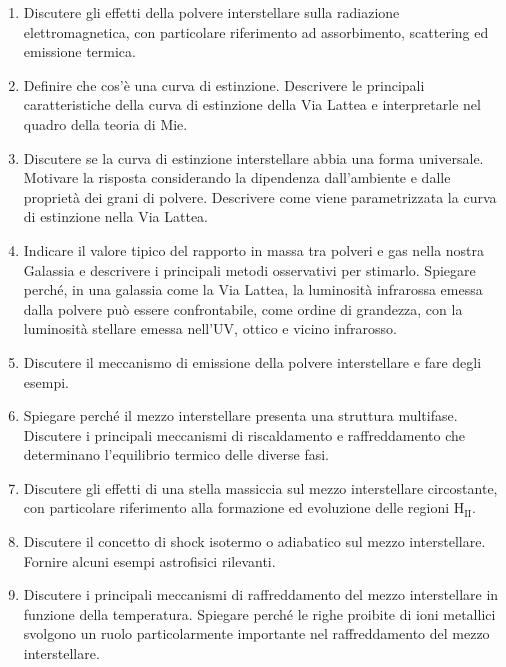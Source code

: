 \begin{enumerate}
    \item Discutere gli effetti della polvere interstellare sulla radiazione elettromagnetica, con particolare riferimento ad assorbimento, scattering ed emissione termica.
    \item Definire che cos’è una curva di estinzione. Descrivere le principali caratteristiche della curva di estinzione della Via Lattea e interpretarle nel quadro della teoria di Mie.
    \item Discutere se la curva di estinzione interstellare abbia una forma universale. Motivare la risposta considerando la dipendenza dall’ambiente e dalle proprietà dei grani di polvere. Descrivere come viene parametrizzata la curva di estinzione nella Via Lattea.
    \item Indicare il valore tipico del rapporto in massa tra polveri e gas nella nostra Galassia e descrivere i principali metodi osservativi per stimarlo. Spiegare perché, in una galassia come la Via Lattea, la luminosità infrarossa emessa dalla polvere può essere confrontabile, come ordine di grandezza, con la luminosità stellare emessa nell’UV, ottico e vicino infrarosso.
    \item Discutere il meccanismo di emissione della polvere interstellare e fare degli esempi.
    \item Spiegare perché il mezzo interstellare presenta una struttura multifase. Discutere i principali meccanismi di riscaldamento e raffreddamento che determinano l’equilibrio termico delle diverse fasi.
    \item Discutere gli effetti di una stella massiccia sul mezzo interstellare circostante, con particolare riferimento alla formazione ed evoluzione delle regioni H$_{\text{II}}$.
    \item Discutere il concetto di shock isotermo o adiabatico sul mezzo interstellare. Fornire alcuni esempi astrofisici rilevanti.
    \item Discutere i principali meccanismi di raffreddamento del mezzo interstellare in funzione della temperatura. Spiegare perché le righe proibite di ioni metallici svolgono un ruolo particolarmente importante nel raffreddamento del mezzo interstellare.
\end{enumerate}